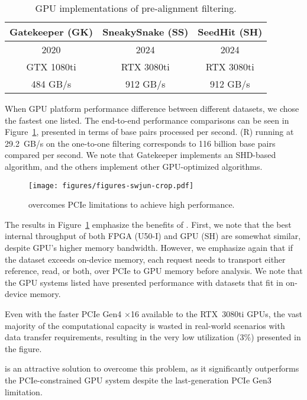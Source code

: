 \begin{table}[h]
    \centering
    \caption{GPU implementations of pre-alignment filtering.}
    \begin{tabular}{|c|c|c|}
        \hline
        Gatekeeper (GK) & SneakySnake (SS) & SeedHit (SH) \\
        \hline
         2020 \cite{bingol2024gatekeepergpu} & 2024 \cite{alser2020sneakysnake} & 2024 \cite{ju2024seedhitgpu} \\
        GTX 1080ti & RTX 3080ti & RTX 3080ti \\
        484 GB/s & 912 GB/s & 912 GB/s \\   
        \hline
    \end{tabular}
    \label{tab:filter_gpus}
\end{table}

When GPU platform performance difference between different datasets, we chose the fastest one listed.
The end-to-end performance comparisons can be seen in Figure~\ref{fig:gpucomp}, presented in terms of base pairs processed per second.
\name{}(R) running at 29.2~GB/s on the one-to-one filtering corresponds to 116 billion base pairs compared per second.
We note that Gatekeeper implements an SHD-based algorithm, and the others implement other GPU-optimized algorithms.

\begin{figure}[htb]
    \centering
    \texttt{[image: figures/figures-swjun-crop.pdf]}
    \caption{\name{} overcomes PCIe limitations to achieve high performance.}
    \label{fig:gpucomp}
\end{figure}

The results in Figure~\ref{fig:gpucomp} emphasize the benefits of \name{}.
First, we note that the best internal throughput of both FPGA (U50-I) and GPU (SH) are somewhat similar, despite GPU's higher memory bandwidth.
However, we emphasize again that if the dataset exceeds on-device memory, each request needs to transport either reference, read, or both, over PCIe to GPU memory before analysis.
We note that the GPU systems listed have presented performance with datasets that fit in on-device memory.

Even with the faster PCIe Gen4 $\times$16 available to the RTX~3080ti GPUs, the vast majority of the computational capacity is wasted in real-world scenarios with data transfer requirements, resulting in the very low utilization (3\%) presented in the figure.

\name{} is an attractive solution to overcome this problem, as it significantly outperforms the PCIe-constrained GPU system despite the last-generation PCIe Gen3 limitation.

